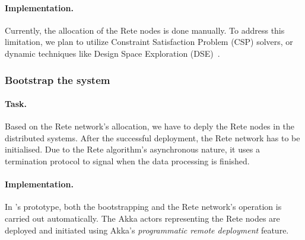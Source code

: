 \paragraph{Implementation.} Currently, the allocation of the Rete nodes is done manually. To address this limitation, we plan to utilize Constraint Satisfaction Problem (CSP) solvers, or dynamic techniques like Design Space Exploration (DSE)~\cite{DSE11}. 

\subsubsection{Bootstrap the system}

\paragraph{Task.} Based on the Rete network's allocation, we have to deply the Rete nodes in the distributed systems. After the successful deployment, the Rete network has to be initialised. Due to the Rete algorithm's asynchronous nature, it uses a termination protocol to signal when the data processing is finished. 

\paragraph{Implementation.} In \iqd{}'s prototype, both the bootstrapping and the Rete network's operation is carried out automatically. The Akka actors representing the Rete nodes are deployed and initiated using Akka's \textit{programmatic remote deployment} feature. 

